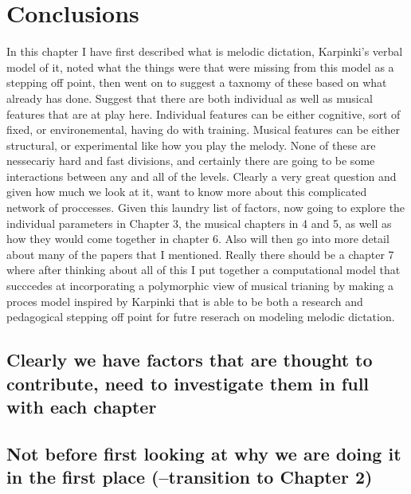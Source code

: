 \documentclass[]{book}
\theoremstyle{definition}
\theoremstyle{definition}
\theoremstyle{definition}
\theoremstyle{remark}
\begin{document}
\hypertarget{conclusions}{%
\section{Conclusions}\label{conclusions}}

In this chapter I have first described what is melodic dictation,
Karpinki's verbal model of it, noted what the things were that were
missing from this model as a stepping off point, then went on to suggest
a taxnomy of these based on what already has done. Suggest that there
are both individual as well as musical features that are at play here.
Individual features can be either cognitive, sort of fixed, or
environemental, having do with training. Musical features can be either
structural, or experimental like how you play the melody. None of these
are nessecariy hard and fast divisions, and certainly there are going to
be some interactions between any and all of the levels. Clearly a very
great question and given how much we look at it, want to know more about
this complicated network of proccesses. Given this laundry list of
factors, now going to explore the individual parameters in Chapter 3,
the musical chapters in 4 and 5, as well as how they would come together
in chapter 6. Also will then go into more detail about many of the
papers that I mentioned. Really there should be a chapter 7 where after
thinking about all of this I put together a computational model that
succcedes at incorporating a polymorphic view of musical trianing by
making a proces model inspired by Karpinki that is able to be both a
research and pedagogical stepping off point for futre reserach on
modeling melodic dictation.

\hypertarget{clearly-we-have-factors-that-are-thought-to-contribute-need-to-investigate-them-in-full-with-each-chapter}{%
\subsection{Clearly we have factors that are thought to contribute, need
to investigate them in full with each
chapter}\label{clearly-we-have-factors-that-are-thought-to-contribute-need-to-investigate-them-in-full-with-each-chapter}}

\hypertarget{not-before-first-looking-at-why-we-are-doing-it-in-the-first-place-transition-to-chapter-2}{%
\subsection{Not before first looking at why we are doing it in the first
place (--transition to Chapter
2)}\label{not-before-first-looking-at-why-we-are-doing-it-in-the-first-place-transition-to-chapter-2}}
\end{document}
